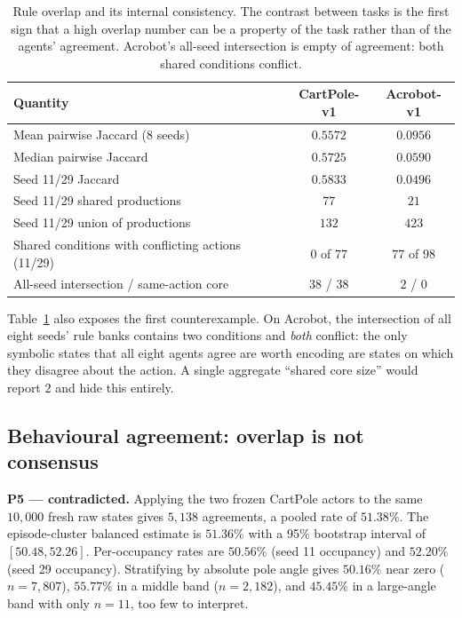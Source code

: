 \documentclass[11pt,a4paper]{article}
\begin{document}
\begin{table}[H]
\centering
\caption{Rule overlap and its internal consistency. The contrast between tasks is the first sign that a high overlap number can be a property of the task rather than of the agents' agreement. Acrobot's all-seed intersection is empty of agreement: both shared conditions conflict.}
\label{tab:overlap}
\small
\begin{tabular}{@{}lcc@{}}
\toprule
\textbf{Quantity} & \textbf{CartPole-v1} & \textbf{Acrobot-v1} \\
\midrule
Mean pairwise Jaccard (8 seeds) & $0.5572$ & $0.0956$ \\
Median pairwise Jaccard & $0.5725$ & $0.0590$ \\
Seed 11/29 Jaccard & $0.5833$ & $0.0496$ \\
Seed 11/29 shared productions & $77$ & $21$ \\
Seed 11/29 union of productions & $132$ & $423$ \\
Shared conditions with conflicting actions (11/29) & $0$ of $77$ & $77$ of $98$ \\
All-seed intersection / same-action core & $38$ / $38$ & $2$ / $0$ \\
\bottomrule
\end{tabular}
\end{table}

Table~\ref{tab:overlap} also exposes the first counterexample. On Acrobot, the intersection of all eight seeds' rule banks contains two conditions and \emph{both} conflict: the only symbolic states that all eight agents agree are worth encoding are states on which they disagree about the action. A single aggregate ``shared core size'' would report $2$ and hide this entirely.

\subsection{Behavioural agreement: overlap is not consensus}
\label{sec:res-agree}

\textbf{P5 --- contradicted.} Applying the two frozen CartPole actors to the same $10{,}000$ fresh raw states gives $5{,}138$ agreements, a pooled rate of $51.38\%$. The episode-cluster balanced estimate is $51.36\%$ with a 95\% bootstrap interval of $[50.48, 52.26]$. Per-occupancy rates are $50.56\%$ (seed 11 occupancy) and $52.20\%$ (seed 29 occupancy). Stratifying by absolute pole angle gives $50.16\%$ near zero ($n=7{,}807$), $55.77\%$ in a middle band ($n=2{,}182$), and $45.45\%$ in a large-angle band with only $n=11$, too few to interpret.
\end{document}
